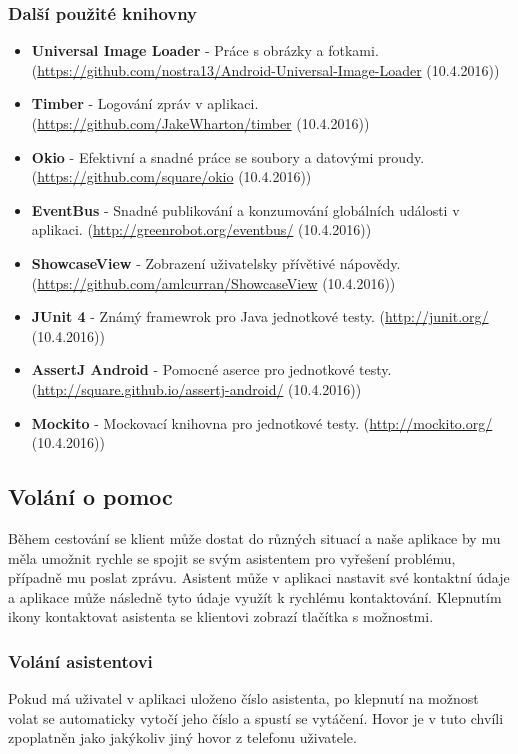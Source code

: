 \documentclass[czech,master,public,dept460,male,java,cpdeclaration]{diploma}
\begin{document}
\subsubsection{Další použité knihovny}
\begin{itemize}
  \item \textbf{Universal Image Loader} - Práce s obrázky a fotkami. (\url{https://github.com/nostra13/Android-Universal-Image-Loader}  (10.4.2016))
  \item \textbf{Timber} - Logování zpráv v aplikaci. (\url{https://github.com/JakeWharton/timber}  (10.4.2016))
  \item \textbf{Okio} - Efektivní a snadné práce se soubory a datovými proudy. (\url{https://github.com/square/okio}  (10.4.2016))
  \item \textbf{EventBus} - Snadné publikování a konzumování globálních události v aplikaci. (\url{http://greenrobot.org/eventbus/}  (10.4.2016))
  \item \textbf{ShowcaseView} - Zobrazení uživatelsky přívětivé nápovědy. (\url{https://github.com/amlcurran/ShowcaseView}  (10.4.2016))
  \item \textbf{JUnit 4} - Známý framewrok pro Java jednotkové testy. (\url{http://junit.org/}  (10.4.2016))
  \item \textbf{AssertJ Android} - Pomocné aserce pro jednotkové testy. (\url{http://square.github.io/assertj-android/}  (10.4.2016))
  \item \textbf{Mockito} - Mockovací knihovna pro jednotkové testy. (\url{http://mockito.org/}  (10.4.2016))


\end{itemize}

\subsection{Volání o pomoc}
Během cestování se klient může dostat do různých situací a naše aplikace by mu měla umožnit rychle se
spojit se svým asistentem pro vyřešení problému, případně mu poslat zprávu. Asistent může v aplikaci nastavit své kontaktní
údaje a aplikace může následně tyto údaje využít k rychlému kontaktování. Klepnutím ikony kontaktovat
asistenta se klientovi zobrazí tlačítka s možnostmi.

\subsubsection{Volání asistentovi}
Pokud má uživatel v aplikaci uloženo číslo asistenta, po klepnutí na možnost volat se automaticky
vytočí jeho číslo a spustí se vytáčení. Hovor je v tuto chvíli zpoplatněn jako jakýkoliv jiný hovor
z telefonu uživatele.
\end{document}
